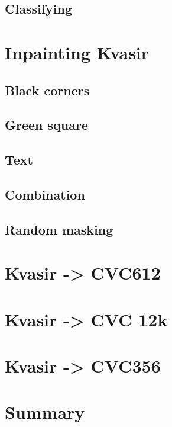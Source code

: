     \subsection{Classifying}
    
\section{Inpainting Kvasir}
    \subsection{Black corners}
    \subsection{Green square}
    \subsection{Text}
    \subsection{Combination}
    \subsection{Random masking}
    
\section{Kvasir -> CVC612}
\section{Kvasir -> CVC 12k}
\section{Kvasir -> CVC356}

\section{Summary
}
